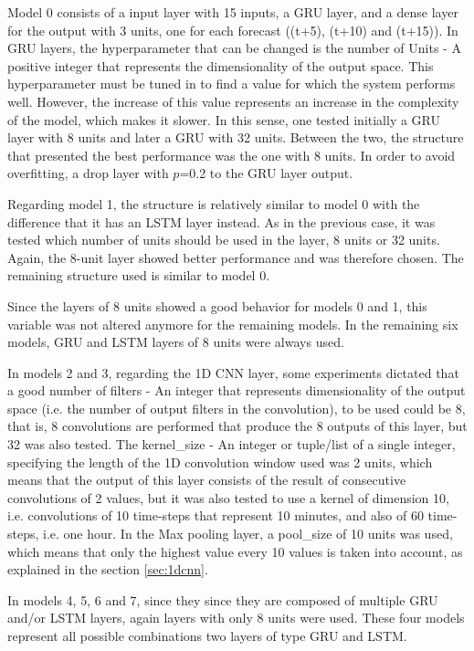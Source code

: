 Model 0 consists of a input layer with 15 inputs, a \ac{GRU} layer, and a dense layer for the output with 3 units, one for each forecast ((t+5), (t+10) and (t+15)). In \ac{GRU} layers, the hyperparameter that can be changed is the number of Units - A positive integer that represents the dimensionality of the output space. This hyperparameter must be tuned in to find a value for which the system performs well. However, the increase of this value represents an increase in the complexity of the model, which makes it slower.  In this sense, one tested initially a \ac{GRU} layer with 8 units and later a \ac{GRU} with 32 units. Between the two, the structure that presented the best performance was the one with 8 units. In order to avoid overfitting, a drop layer with $p$=0.2 to the \ac{GRU} layer output.

Regarding model 1, the structure is relatively similar to model 0 with the difference that it has an \ac{LSTM} layer instead. As in the previous case, it was tested which number of units should be used in the layer, 8 units or 32 units.  Again, the 8-unit layer showed better performance and was therefore chosen. The remaining structure used is similar to model 0.

Since the layers of 8 units showed a good behavior for models 0 and 1, this variable was not altered anymore for the remaining models. In the remaining six models, \ac{GRU} and \ac{LSTM} layers of 8 units were always used.

In models 2 and 3, regarding the \ac{1D CNN} layer, some experiments dictated that a good number of filters - An integer that represents dimensionality of the output space (i.e. the number of output filters in the convolution), to be used could be 8, that is, 8 convolutions are performed that produce the 8 outputs of this layer, but 32 was also tested. The kernel\_size - An integer or tuple/list of a single integer, specifying the length of the 1D convolution window used was 2 units, which means that the output of this layer consists of the result of consecutive convolutions of 2 values, but it was also tested to use a kernel of dimension 10, i.e. convolutions of 10 time-steps that represent 10 minutes, and also of 60 time-steps, i.e. one hour. In the Max pooling layer, a pool\_size of 10 units was used, which means that only the highest value every 10 values is taken into account, as explained in the section \ref{sec:1dcnn}.

In models 4, 5, 6 and 7, since they since they are composed of multiple \ac{GRU} and/or \ac{LSTM} layers, again layers with only 8 units were used. These four models represent all possible combinations two layers of type \ac{GRU} and \ac{LSTM}. 

